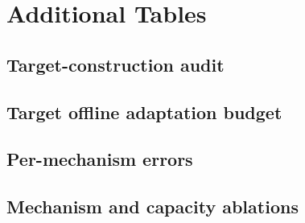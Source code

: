 \section{Additional Tables}

\subsection{Target-construction audit}

\begin{table}[h]
\centering
\scriptsize
\resizebox{\textwidth}{!}{}
\caption{Target-construction audit and route-level nontriviality check.}
\label{tab:target-audit}
\end{table}

\subsection{Target offline adaptation budget}

\begin{table}[h]
\centering
\small
\resizebox{\textwidth}{!}{}
\caption{Target-route offline-adaptation budget summary. Budget $1.0$ is an in-sample oracle reference.}
\label{tab:calibration-summary}
\end{table}

\subsection{Per-mechanism errors}

\begin{table}[h]
\centering
\small
\resizebox{\textwidth}{!}{}
\caption{Per-mechanism strict leave-one-city-out error ratios.}
\label{tab:mechanism-summary}
\end{table}

\subsection{Mechanism and capacity ablations}

\begin{table}[h]
\centering
\small
\resizebox{\textwidth}{!}{}
\caption{Mechanism and capacity ablations. Lower mean ratios indicate better transfer relative to \Htwo.}
\label{tab:ablation}
\end{table}

